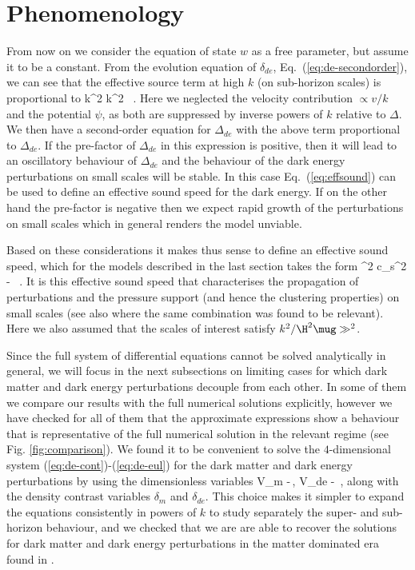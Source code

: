 \section{Phenomenology}
\label{chapter-ade:phenomenology}

From now on we consider  the equation of state $w$ as a free parameter, but assume it to be a constant. From the evolution equation of $\delta_{de}$, Eq.\ (\ref{eq:de-secondorder}), we can see that the effective source term at high $k$ 
(on sub-horizon scales) is proportional to
\be
k^2 
\approx  k^2  \, . \label{eq:effsound} \label{eq:pheno1} 
\ee
Here we neglected the velocity contribution $\propto v/k$ and the potential $\psi$, as both are suppressed by inverse powers of $k$
relative to $\Delta$. We then have a second-order equation for $\Delta_{de}$ with the above term proportional to $\Delta_{de}$. 
If the pre-factor of $\Delta_{de}$ in this expression is positive, then it will lead to an oscillatory behaviour of $\Delta_{de}$ and the behaviour of the dark energy perturbations on small scales will be stable. In this case Eq.\ (\ref{eq:effsound}) can be used to define an effective sound speed for the dark energy. If on the other hand the pre-factor is negative then we expect rapid growth of the perturbations on small scales which in general renders the model unviable. 

Based on these considerations it makes thus sense to define an effective sound speed, which for the models described in the last section takes the form 
\be 
\ceff^2 \equiv c_s^2 - \, .
\label{eq:pheno2}
\ee
It is this effective sound speed that characterises the propagation of perturbations and the pressure support (and hence the clustering properties) on small scales (see
also \cite{Sapone:2012nh,Sawicki:2012re,Sapone:2013wda} where the same combination was found to be relevant). Here we
also assumed that the scales of interest satisfy $ k^2/\H^2 \mug \gg^2 $.

Since the full system of differential equations cannot be solved analytically in general, we will focus in the next subsections on limiting cases for which dark matter and dark energy perturbations decouple from each other. In some of them we compare our results with the full numerical solutions explicitly, however we have checked for all of them that the approximate expressions show a behaviour that is representative of the full numerical solution in the relevant regime (see Fig. \ref{fig:comparison}).
We found it to be convenient to solve the $4$-dimensional system (\ref{eq:de-cont})-(\ref{eq:de-eul}) for the dark matter and dark energy perturbations by using the dimensionless variables  
\be
V_m \equiv  -\,, \quad
V_{de} \equiv - \,,
\label{eq:pheno3} 
\ee
along with the density contrast variables $ \delta_m$ and $ \delta_{de}$. This choice makes it simpler to expand the equations consistently in powers of $k$ 
to study separately the super- and sub-horizon behaviour, and we checked that we are
are able to recover the solutions for dark matter and dark energy perturbations in the matter dominated era found in \cite{Sapone:2009kx}. 

